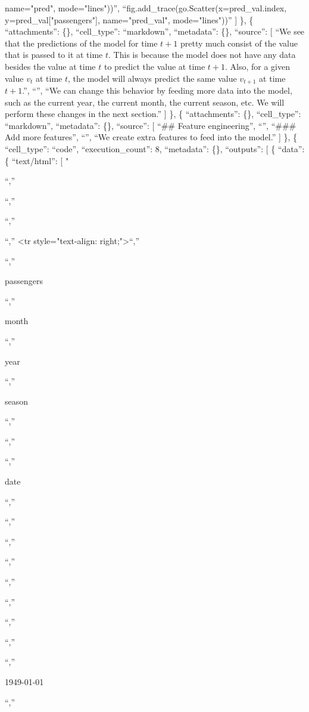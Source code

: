 \documentclass[
]{article}
\begin{document}
name="pred", mode="lines"))\n'',
``fig.add\_trace(go.Scatter(x=pred\_val.index,
y=pred\_val{[}"passengers"{]}, name="pred\_val", mode="lines"))'' {]}
\}, \{ ``attachments'': \{\}, ``cell\_type'': ``markdown'',
``metadata'': \{\}, ``source'': {[} ``We see that the predictions of the
model for time \(t+1\) pretty much consist of the value that is passed
to it at time \(t\). This is because the model does not have any data
besides the value at time \(t\) to predict the value at time \(t+1\).
Also, for a given value \(v_t\) at time \(t\), the model will always
predict the same value \(v_{t+1}\) at time \(t+1\).\n'', ``\n'', ``We
can change this behavior by feeding more data into the model, such as
the current year, the current month, the current season, etc. We will
perform these changes in the next section.'' {]} \}, \{ ``attachments'':
\{\}, ``cell\_type'': ``markdown'', ``metadata'': \{\}, ``source'': {[}
``\#\# Feature engineering\n'', ``\n'', ``\#\#\# Add more features\n'',
``\n'', ``We create extra features to feed into the model.\n'' {]} \},
\{ ``cell\_type'': ``code'', ``execution\_count'': 8, ``metadata'':
\{\}, ``outputs'': {[} \{ ``data'': \{ ``text/html'': {[} "

\n``,''

\n``,''

\n``,''

\n``,'' \textless tr style="text-align: right;"\textgreater{}\n``,''

\n``,''

passengers

\n``,''

month

\n``,''

year

\n``,''

season

\n``,''

\n``,''

\n``,''

date

\n``,''

\n``,''

\n``,''

\n``,''

\n``,''

\n``,''

\n``,''

\n``,''

\n``,''

1949-01-01

\n``,''
\end{document}
